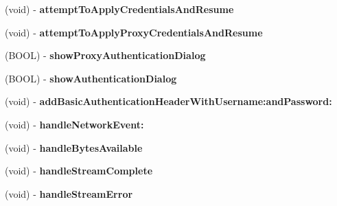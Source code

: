 \begin{DoxyCompactItemize}
\item 
\hypertarget{interface_a_s_i_h_t_t_p_request_ad3da0a488faf41101bbf73a8071456e8}{
(void) -\/ {\bfseries attempt\-To\-Apply\-Credentials\-And\-Resume}}
\label{interface_a_s_i_h_t_t_p_request_ad3da0a488faf41101bbf73a8071456e8}

\item 
\hypertarget{interface_a_s_i_h_t_t_p_request_a03ce363e92c2d5dbe7229f021b0230a5}{
(void) -\/ {\bfseries attempt\-To\-Apply\-Proxy\-Credentials\-And\-Resume}}
\label{interface_a_s_i_h_t_t_p_request_a03ce363e92c2d5dbe7229f021b0230a5}

\item 
\hypertarget{interface_a_s_i_h_t_t_p_request_ad9c4b7b0abc790e74806860c6d7a7a5b}{
(\-B\-O\-O\-L) -\/ {\bfseries show\-Proxy\-Authentication\-Dialog}}
\label{interface_a_s_i_h_t_t_p_request_ad9c4b7b0abc790e74806860c6d7a7a5b}

\item 
\hypertarget{interface_a_s_i_h_t_t_p_request_a64d812546f152b29ddd614938ffa5539}{
(\-B\-O\-O\-L) -\/ {\bfseries show\-Authentication\-Dialog}}
\label{interface_a_s_i_h_t_t_p_request_a64d812546f152b29ddd614938ffa5539}

\item 
\hypertarget{interface_a_s_i_h_t_t_p_request_a0295b7fbbc9af2be76f9dfe06f75f1ca}{
(void) -\/ {\bfseries add\-Basic\-Authentication\-Header\-With\-Username\-:and\-Password\-:}}
\label{interface_a_s_i_h_t_t_p_request_a0295b7fbbc9af2be76f9dfe06f75f1ca}

\item 
\hypertarget{interface_a_s_i_h_t_t_p_request_a271ec6e669cafa5063866022fb3577ba}{
(void) -\/ {\bfseries handle\-Network\-Event\-:}}
\label{interface_a_s_i_h_t_t_p_request_a271ec6e669cafa5063866022fb3577ba}

\item 
\hypertarget{interface_a_s_i_h_t_t_p_request_aefae44a699dc9e70b78930322cfb3558}{
(void) -\/ {\bfseries handle\-Bytes\-Available}}
\label{interface_a_s_i_h_t_t_p_request_aefae44a699dc9e70b78930322cfb3558}

\item 
\hypertarget{interface_a_s_i_h_t_t_p_request_aaf27f7d11cd1194d5087db56cc553d89}{
(void) -\/ {\bfseries handle\-Stream\-Complete}}
\label{interface_a_s_i_h_t_t_p_request_aaf27f7d11cd1194d5087db56cc553d89}

\item 
\hypertarget{interface_a_s_i_h_t_t_p_request_ab792c755bbcec55490688d2b5aa729ec}{
(void) -\/ {\bfseries handle\-Stream\-Error}}
\label{interface_a_s_i_h_t_t_p_request_ab792c755bbcec55490688d2b5aa729ec}


\end{DoxyCompactItemize}
